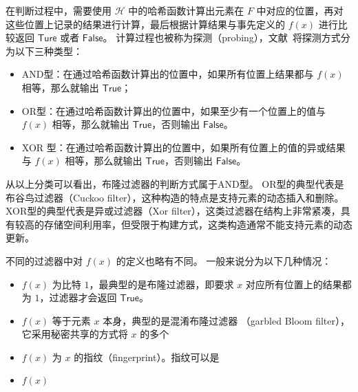 在判断过程中，需要使用 $\mathcal{H}$ 中的哈希函数计算出元素在 $F$ 中对应的位置，再对这些位置上记录的结果进行计算，最后根据计算结果与事先定义的 $f(x)$ 进行比较返回 $\mathsf{Ture}$ 或者 $\mathsf{False}$。
计算过程也被称为探测（probing），文献~\cite{dillinger2021ribbon}将探测方式分为以下三种类型：
\begin{itemize}
    \item AND型：在通过哈希函数计算出的位置中，如果所有位置上结果都与 $f(x)$ 相等，那么就输出 $\mathsf{True}$；
    \item OR型：在通过哈希函数计算出的位置中，如果至少有一个位置上的值与 $f(x)$ 相等，那么就输出 $\mathsf{True}$，否则输出 $\mathsf{False}$。
    \item XOR 型：在通过哈希函数计算出的位置中，如果所有位置上的值的异或结果与 $f(x)$ 相等，那么就输出 $\mathsf{True}$，否则输出 $\mathsf{False}$。
\end{itemize}
从以上分类可以看出，布隆过滤器的判断方式属于AND型。
OR型的典型代表是布谷鸟过滤器（Cuckoo filter），这种构造的特点是支持元素的动态插入和删除。
XOR型的典型代表是异或过滤器（Xor filter），这类过滤器在结构上非常紧凑，具有较高的存储空间利用率，但受限于构建方式，这类构造通常不能支持元素的动态更新。


不同的过滤器中对 $f(x)$ 的定义也略有不同。
一般来说分为以下几种情况：
\begin{itemize}
    \item $f(x)$ 为比特 $1$，最典型的是布隆过滤器，即要求 $x$ 对应所有位置上的结果都为 $1$，过滤器才会返回 $\mathsf{True}$。
    \item $f(x)$ 等于元素 $x$ 本身，典型的是混淆布隆过滤器 （garbled Bloom filter），它采用秘密共享的方式将 $x$ 的多个
    \item $f(x)$ 为 $x$ 的指纹（fingerprint）。指纹可以是
    \item $f(x)$
\end{itemize}

